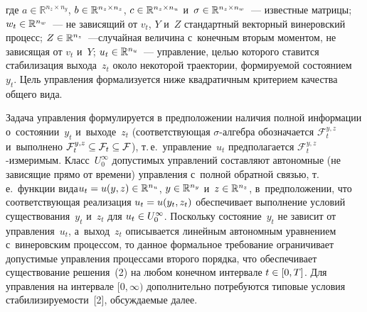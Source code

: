 \begin{multicols}{2}
     \vspace*{-3pt}

\noindent
где $a\in \mathbb{R}^{n_z\times n_y}$, $b\hm\in \mathbb{R}^{n_z\times n_z}$, 
$c\hm\in \mathbb{R}^{n_z\times n_u}$ и~$\sigma\hm\in \mathbb{R}^{n_z\times n_w}$~--- известные матрицы; $w_t\hm\in \mathbb{R}^{n_w}$~--- не 
зависящий от $v_t$, $Y$ и~$Z$ стандартный векторный винеровский процесс; 
$Z\hm\in \mathbb{R}^{n_z}$~---случайная величина с~конечным вторым 
моментом, не зависящая от $v_t$ и~$Y$; $u_t\hm\in \mathbb{R}^{n_u}$~--- 
управление, целью которого ставится стабилизация выхода~$z_t$ около 
некоторой траектории, формируемой со\-сто\-яни\-ем~$y_t$. Цель управ\-ле\-ния 
формализуется ниже квад\-ра\-тич\-ным критерием качества общего вида.

     Задача управления формулируется в предположении наличия полной 
информации о~со\-сто\-янии~$y_t$ и~выходе~$z_t$ (со\-от\-вет\-ст\-ву\-ющая  
$\sigma$-ал\-геб\-ра обозначается $\mathcal{F}_t^{y,z}$ и~выполнено 
$\mathcal{F}_t^{y,z}\hm\subseteq \mathcal{F}_t\hm\subseteq \mathcal{F}$), 
т.\,е.\ управ\-ле\-ние~$u_t$ предполагается  
$\mathcal{F}_t^{y,z}$-из\-ме\-ри\-мым. Класс~$U_0^\infty$ допустимых 
управ\-ле\-ний составляют автономные (не зависящие прямо от времени) 
управ\-ле\-ния с~пол\-ной обратной связью, т.\,е.\ функции вида\linebreak $u_t\hm= 
u(y,z)\hm\in\mathbb{R}^{n_u}$, $y\hm\in \mathbb{R}^{n_y}$ и~$z\hm\in 
\mathbb{R}^{n_z}$, в~предположении, что со\-от\-вет\-ст\-ву\-ющая реализация 
$u_t\hm= u(y_t,z_t)$ обеспечивает выполнение условий существования~$y_t$ 
и~$z_t$ для $u_t\hm\in U_0^\infty$. Поскольку \mbox{со\-сто\-яние}~$y_t$  не зависит
от  управ\-ле\-ния~$u_t$, а~выход~$z_t$ описывается линейным 
автономным уравнением с~винеровским процессом, то данное формальное 
требование ограничивает допустимые управ\-ле\-ния процессами второго 
порядка, что обеспечивает существование решения~(2) на любом конечном 
интервале $t\hm\in [0,T]$. Для управ\-ле\-ния на интервале $[0,\infty)$ 
дополнительно потребуются типовые условия ста\-би\-ли\-зи\-ру\-емости~[2], 
обсуж\-да\-емые далее.
     

\end{multicols}
